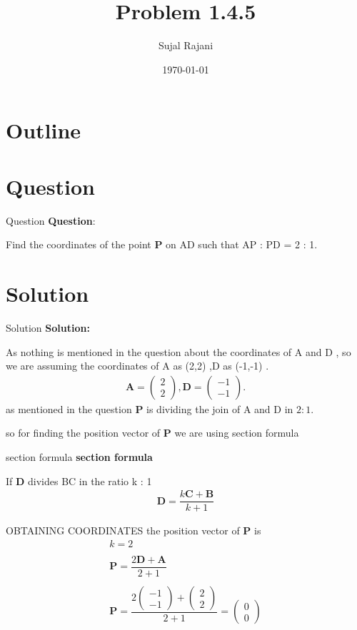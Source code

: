 \documentclass{beamer}
\title{Problem 1.4.5}
\author{Sujal Rajani}
\date{\today}
\let\vec\mathbf
\newcommand{\myvec}[1]{\ensuremath{\begin{pmatrix}#1\end{pmatrix}}}
\theoremstyle{remark}
\numberwithin{equation}{section}
\begin{document}
\begin{frame}
\titlepage
\end{frame}

\section*{Outline}
\begin{frame}
\tableofcontents
\end{frame}
\section{Question}
\begin{frame}{Question}
\textbf{Question}:


\noindent Find the coordinates of the point $\vec{P}$ on AD such that AP : PD = 2 : 1.    
\end{frame}
\section{Solution}
\begin{frame}{Solution}
\textbf{Solution:} 

As nothing is mentioned in the question about the coordinates of A and D , so we are assuming the coordinates of A as (2,2) ,D as (-1,-1) .
\begin{align}
			\vec A = \myvec{2\\2},\vec D = \myvec{-1\\-1}.
\end{align}
as mentioned in the question $\vec{P}$ is dividing the join of A and D in $2:1$.

so for finding the position vector of $\vec{P}$ we are using section formula 
\end{frame} 
\begin{frame}{section formula }
    \textbf{section formula }

If $\vec{D}$ divides BC in the ratio k : 1
\begin{align*}
     \vec{D}=\dfrac{k\vec{C}+\vec{B}}{k+1}
\end{align*}

\end{frame}
\begin{frame}{OBTAINING COORDINATES}
    the position vector of $\vec{P}$ is 
\begin{align*}
k=2
      \\
      \\
     \vec{P}=\dfrac{2\vec{D}+\vec{A}}{2+1}
     \\
     \\
     \vec{P}=\dfrac{2\myvec{-1\\-1}+\myvec{2\\2}}{2+1}=\myvec{0\\0}
\end{align*}

\end{frame}
\end{document}
